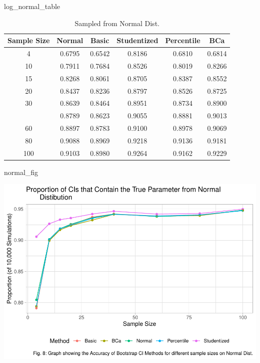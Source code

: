 \documentclass[12pt]{article}
\newenvironment{Shaded}{\begin{snugshade}}{\end{snugshade}}
\newcommand{\NormalTok}[1]{#1}
\begin{document}
\begin{Shaded}
\begin{Highlighting}[]
\NormalTok{log\_normal\_table}
\end{Highlighting}
\end{Shaded}

\begin{table}

\caption{\label{tab:create graphs}Sampled from Normal Dist.}
\centering
\begin{tabular}[t]{cccccc}
\toprule
Sample Size & Normal & Basic & Studentized & Percentile & BCa\\
\midrule
4 & 0.6795 & 0.6542 & 0.8186 & 0.6810 & 0.6814\\
10 & 0.7911 & 0.7684 & 0.8526 & 0.8019 & 0.8266\\
15 & 0.8268 & 0.8061 & 0.8705 & 0.8387 & 0.8552\\
20 & 0.8437 & 0.8236 & 0.8797 & 0.8526 & 0.8725\\
30 & 0.8639 & 0.8464 & 0.8951 & 0.8734 & 0.8900\\
\addlinespace
40 & 0.8789 & 0.8623 & 0.9055 & 0.8881 & 0.9013\\
60 & 0.8897 & 0.8783 & 0.9100 & 0.8978 & 0.9069\\
80 & 0.9088 & 0.8969 & 0.9218 & 0.9136 & 0.9181\\
100 & 0.9103 & 0.8980 & 0.9264 & 0.9162 & 0.9229\\
\bottomrule
\end{tabular}
\end{table}

\begin{Shaded}
\begin{Highlighting}[]
\NormalTok{normal\_fig}
\end{Highlighting}
\end{Shaded}

\includegraphics{paper_files/figure-latex/output the graphs/tables-2.pdf}
\end{document}
